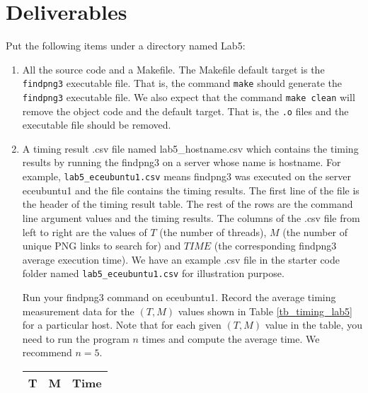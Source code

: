 \section{Deliverables}
\label{sec:lab5:postlab}
Put the following items under a directory named Lab5:
\begin{enumerate}
\item All the source code and a Makefile. The Makefile default target is the \verb+findpng3+ executable file. That is, the command \verb+make+ should generate the \verb+findpng3+ executable file. We also expect that the command \verb+make clean+ will remove the object code and the default target. That is, the \verb+.o+ files and the executable file should be removed.
\item A timing result .csv file named lab5\_hostname.csv 
  which contains the timing results by running the findpng3 on a server whose name is hostname. For example, \verb+lab5_eceubuntu1.csv+ means findpng3 was executed on the server eceubuntu1 and the file contains the timing results.
  The first line of the file is the header of the timing result table. The rest of the rows are the command line argument values and the timing results. The columns of the .csv file from left to right are the values of $T$ (the number of threads), $M$ (the number of unique PNG links to search for) and $TIME$ (the corresponding findpng3 average execution time). We have an example .csv file in the starter code folder named \verb+lab5_eceubuntu1.csv+ for illustration purpose.

  Run your findpng3 command on eceubuntu1. Record the average timing measurement data for the $(T, M)$ values shown in Table \ref{tb_timing_lab5} for a particular host. Note that for each given $(T, M)$ value in the table, you need to run the program $n$ times and compute the average time. We recommend $n=5$.
\begin{table}[h]
\begin{center}
\begin{tabular}{|c|c|c|}
\hline
T     & M    & Time \\ \hline


\end{tabular}
\end{center}
\end{table}
\end{enumerate}

